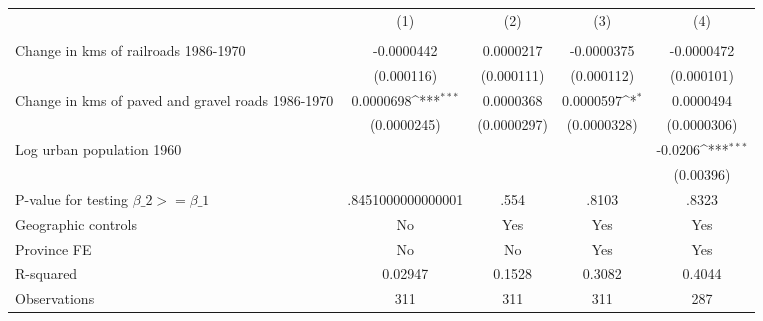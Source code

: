 {
\def\sym#1{\ifmmode^{#1}\else\(^{#1}\)\fi}
\begin{tabular}{l*{4}{c}}
\hline\hline
                &\multicolumn{1}{c}{(1)}&\multicolumn{1}{c}{(2)}&\multicolumn{1}{c}{(3)}&\multicolumn{1}{c}{(4)}\\
                &\multicolumn{1}{c}{}&\multicolumn{1}{c}{}&\multicolumn{1}{c}{}&\multicolumn{1}{c}{}\\
\hline
Change in kms of railroads 1986-1970&-0.0000442         &0.0000217         &-0.0000375         &-0.0000472         \\
                &(0.000116)         &(0.000111)         &(0.000112)         &(0.000101)         \\
[1em]
Change in kms of paved and gravel roads 1986-1970&0.0000698\sym{***}&0.0000368         &0.0000597\sym{*}  &0.0000494         \\
                &(0.0000245)         &(0.0000297)         &(0.0000328)         &(0.0000306)         \\
[1em]
Log urban population 1960&                  &                  &                  &  -0.0206\sym{***}\\
                &                  &                  &                  &(0.00396)         \\
\hline
P-value for testing $\beta\_{2} >= \beta\_{1}$&.8451000000000001         &     .554         &    .8103         &    .8323         \\
Geographic controls&       No         &      Yes         &      Yes         &      Yes         \\
Province FE     &       No         &       No         &      Yes         &      Yes         \\
R-squared       &  0.02947         &   0.1528         &   0.3082         &   0.4044         \\
Observations    &      311         &      311         &      311         &      287         \\
\hline\hline
\end{tabular}
}
